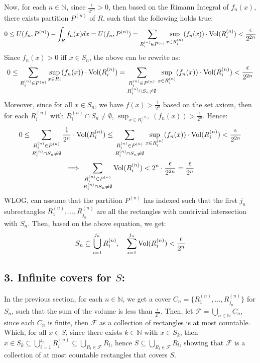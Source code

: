 \documentclass{article}
\begin{document}
Now, for each $n\in\mathbb{N}$, since $\frac{\epsilon}{2^{2n}}>0$, then based on the Rimann Integral of $f_n(x)$, there exists partition $P^{(n)}$ of $R$, such that the following holds true:
\begin{equation}
    0\leq U(f_n,P^{(n)})-\int_{R}f_n(x)dx = U(f_n,P^{(n)}) = \sum_{R_i^{(n)}\in P^{(n)}}\sup_{x\in R_i^{(n)}}(f_n(x))\cdot \textmd{Vol}(R_i^{(n)}) < \frac{\epsilon}{2^{2n}}
\end{equation}
Since $f_n(x)>0$ iff $x\in S_n$, the above can be rewrite as:
$$0\leq \sum_{R_i^{(n)}\in P^{(n)}}\sup_{x\in R_i}(f_n(x))\cdot \textmd{Vol}(R_i^{(n)}) = \sum_{\substack{R_i^{(n)}\in P^{(n)}\\R_i^{(n)}\cap S_n\neq \emptyset}}\sup_{x\in R_i^{(n)}}(f_n(x))\cdot \textmd{Vol}(R_i^{(n)})<\frac{\epsilon}{2^{2n}}$$
Moreover, since for all $x\in S_n$, we have $f(x)>\frac{1}{2^n}$ based on the set axiom, then for each $R_i^{(n)}$ with $R_i^{(n)}\cap S_n\neq\emptyset$, $\sup_{x\in R_i^{(n)}}(f_n(x))>\frac{1}{2^n}$. Hence:
\begin{equation}
    0\leq \sum_{\substack{R_i^{(n)}\in P^{(n)}\\R_i^{(n)}\cap S_n\neq \emptyset}}\frac{1}{2^n}\cdot \textmd{Vol}(R_i^{(n)})\leq \sum_{\substack{R_i^{(n)}\in P^{(n)}\\R_i^{(n)}\cap S_n\neq \emptyset}}\sup_{x\in R_i^{(n)}}(f_n(x))\cdot \textmd{Vol}(R_i^{(n)}) < \frac{\epsilon}{2^{2n}}
\end{equation}
\begin{equation}
    \implies \sum_{\substack{R_i^{(n)}\in P^{(n)}\\R_i^{(n)}\cap S_n\neq \emptyset}}\textmd{Vol}(R_i^{(n)})<2^n\cdot \frac{\epsilon}{2^{2n}} = \frac{\epsilon}{2^n}
\end{equation}
WLOG, can assume that the partition $P^{(n)}$ has indexed such that the first $j_n$ subrectangles $R_1^{(n)},...,R_{j_n}^{(n)}$ are all the rectangles with nontrivial intersection with $S_n$. Then, based on the above equation, we get:
\begin{equation}
    S_n\subseteq\bigcup_{i=1}^{j_n}R_i^{(n)},\quad \sum_{i=1}^{j_n}\textmd{Vol}(R_i^{(n)}) < \frac{\epsilon}{2^n}
\end{equation}

\subsection*{3. Infinite covers for $S$:}
In the previous section, for each $n\in\mathbb{N}$, we get a cover $C_n=\{R_1^{(n)},...,R_{j_n}^{(n)}\}$ for $S_n$, such that the sum of the volume is less than $\frac{\epsilon}{2^n}$. Then, let $\mathcal{F}=\bigcup_{n\in\mathbb{N}}C_n$, since each $C_n$ is finite, then $\mathcal{F}$ as a collection of rectangles is at most countable. Which, for all $x\in S$, since there exists $k\in\mathbb{N}$ with $x\in S_k$, then $x\in S_k\subseteq \bigcup_{i=1}^{j_n}R_i^{(n)}\subseteq \bigcup_{R_l\in \mathcal{F}}R_l$, hence $S\subseteq \bigcup_{R_l\in\mathcal{F}}R_l$, showing that $\mathcal{F}$ is a collection of at most countable rectangles that covers $S$.
\end{document}
